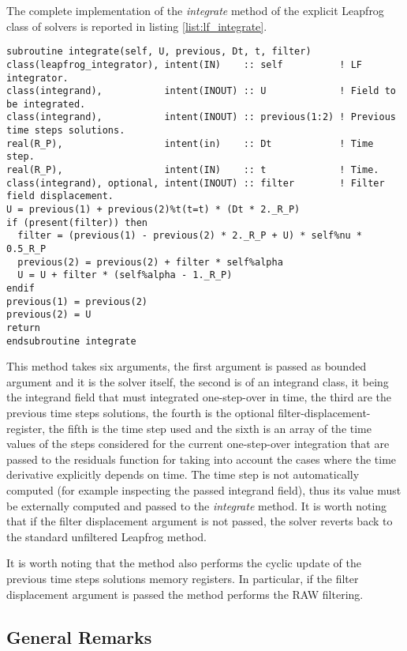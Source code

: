 \documentclass[pdftex,preprint,3p,times,numbers]{elsarticle}
\begin{document}
The complete implementation of the \emph{integrate} method of the explicit Leapfrog class of solvers is reported in listing \ref{list:lf_integrate}.

\begin{lstlisting}[firstnumber=1,style=code,caption={implementation of the \emph{integrate} method of explicit Leapfrog class},label={list:lf_integrate}]
subroutine integrate(self, U, previous, Dt, t, filter)
class(leapfrog_integrator), intent(IN)    :: self          ! LF integrator.
class(integrand),           intent(INOUT) :: U             ! Field to be integrated.
class(integrand),           intent(INOUT) :: previous(1:2) ! Previous time steps solutions.
real(R_P),                  intent(in)    :: Dt            ! Time step.
real(R_P),                  intent(IN)    :: t             ! Time.
class(integrand), optional, intent(INOUT) :: filter        ! Filter field displacement.
U = previous(1) + previous(2)%t(t=t) * (Dt * 2._R_P)
if (present(filter)) then
  filter = (previous(1) - previous(2) * 2._R_P + U) * self%nu * 0.5_R_P
  previous(2) = previous(2) + filter * self%alpha
  U = U + filter * (self%alpha - 1._R_P)
endif
previous(1) = previous(2)
previous(2) = U
return
endsubroutine integrate
\end{lstlisting}

This method takes six arguments, the first argument is passed as bounded argument and it is the solver itself, the second is of an integrand class, it being the integrand field that must integrated one-step-over in time, the third are the previous time steps solutions, the fourth is the optional filter-displacement-register, the fifth is the time step used and the sixth is an array of the time values of the steps considered for the current one-step-over integration that are passed to the residuals function for taking into account the cases where the time derivative explicitly depends on time. The time step is not automatically computed (for example inspecting the passed integrand field), thus its value must be externally computed and passed to the \emph{integrate} method. It is worth noting that if the filter displacement argument is not passed, the solver reverts back to the standard unfiltered Leapfrog method.

It is worth noting that the method also performs the cyclic update of the previous time steps solutions memory registers. In particular, if the filter displacement argument is passed the method performs the RAW filtering.

\subsection{General Remarks}\label{subsec:API-remarks}
\end{document}
